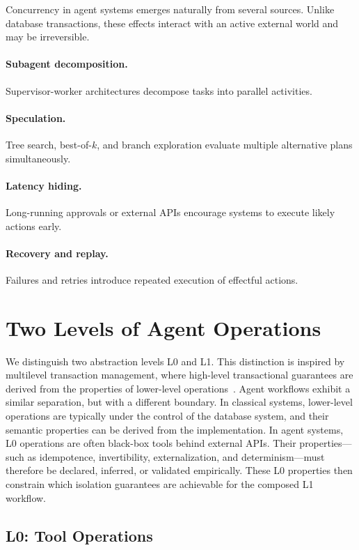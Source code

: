 \documentclass[11pt]{article}
\begin{document}
Concurrency in agent systems emerges naturally from several sources. Unlike database transactions, these effects interact with an active
external world and may be irreversible.

\paragraph{Subagent decomposition.}
Supervisor-worker architectures decompose tasks into parallel
activities.

\paragraph{Speculation.}
Tree search, best-of-$k$, and branch exploration evaluate multiple
alternative plans simultaneously.

\paragraph{Latency hiding.}
Long-running approvals or external APIs encourage systems to execute
likely actions early.

\paragraph{Recovery and replay.}
Failures and retries introduce repeated execution of effectful actions.

\section{Two Levels of Agent Operations}

We distinguish two abstraction levels L0 and L1. This distinction is inspired by multilevel transaction management, where
high-level transactional guarantees are derived from the properties of
lower-level operations~\cite{weikum1991principles}. Agent workflows
exhibit a similar separation, but with a different boundary. In classical
systems, lower-level operations are typically under the control of the
database system, and their semantic properties can be derived from the
implementation. In agent systems, L0 operations are often black-box tools
behind external APIs. Their properties---such as idempotence,
invertibility, externalization, and determinism---must therefore be
declared, inferred, or validated empirically. These L0 properties then
constrain which isolation guarantees are achievable for the composed L1
workflow.

\subsection{L0: Tool Operations}
\end{document}
